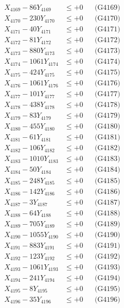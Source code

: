 \documentclass[a4paper,10pt]{article}
\begin{document}
{\begin{align}
X_{4169} - 86Y_{4169} &\leq +0 && \text{(G4169)} \\
X_{4170} - 230Y_{4170} &\leq +0 && \text{(G4170)} \\
\allowbreak
X_{4171} - 40Y_{4171} &\leq +0 && \text{(G4171)} \\
X_{4172} - 81Y_{4172} &\leq +0 && \text{(G4172)} \\
X_{4173} - 880Y_{4173} &\leq +0 && \text{(G4173)} \\
X_{4174} - 1061Y_{4174} &\leq +0 && \text{(G4174)} \\
X_{4175} - 424Y_{4175} &\leq +0 && \text{(G4175)} \\
X_{4176} - 1061Y_{4176} &\leq +0 && \text{(G4176)} \\
X_{4177} - 101Y_{4177} &\leq +0 && \text{(G4177)} \\
X_{4178} - 438Y_{4178} &\leq +0 && \text{(G4178)} \\
X_{4179} - 83Y_{4179} &\leq +0 && \text{(G4179)} \\
X_{4180} - 455Y_{4180} &\leq +0 && \text{(G4180)} \\
\allowbreak
X_{4181} - 61Y_{4181} &\leq +0 && \text{(G4181)} \\
X_{4182} - 106Y_{4182} &\leq +0 && \text{(G4182)} \\
X_{4183} - 1010Y_{4183} &\leq +0 && \text{(G4183)} \\
X_{4184} - 50Y_{4184} &\leq +0 && \text{(G4184)} \\
X_{4185} - 248Y_{4185} &\leq +0 && \text{(G4185)} \\
X_{4186} - 142Y_{4186} &\leq +0 && \text{(G4186)} \\
X_{4187} - 3Y_{4187} &\leq +0 && \text{(G4187)} \\
X_{4188} - 64Y_{4188} &\leq +0 && \text{(G4188)} \\
X_{4189} - 705Y_{4189} &\leq +0 && \text{(G4189)} \\
X_{4190} - 1055Y_{4190} &\leq +0 && \text{(G4190)} \\
\allowbreak
X_{4191} - 883Y_{4191} &\leq +0 && \text{(G4191)} \\
X_{4192} - 123Y_{4192} &\leq +0 && \text{(G4192)} \\
X_{4193} - 1061Y_{4193} &\leq +0 && \text{(G4193)} \\
X_{4194} - 241Y_{4194} &\leq +0 && \text{(G4194)} \\
X_{4195} - 8Y_{4195} &\leq +0 && \text{(G4195)} \\
X_{4196} - 35Y_{4196} &\leq +0 && \text{(G4196)} \\

\end{align}}
\end{document}
